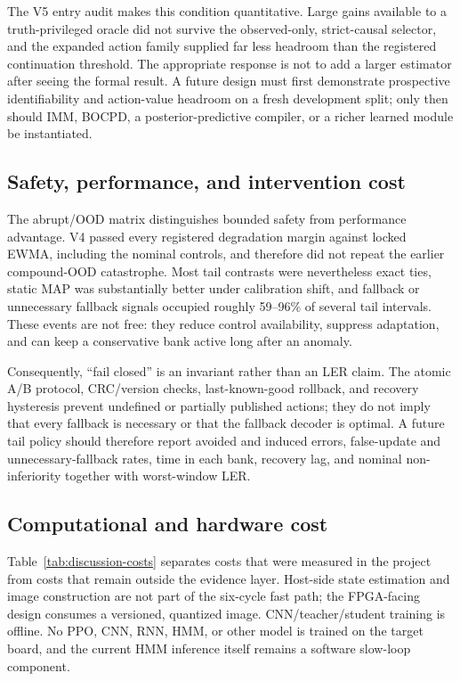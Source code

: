 \documentclass[11pt]{article}
\begin{document}
The V5 entry audit makes this condition quantitative.  Large gains available
to a truth-privileged oracle did not survive the observed-only, strict-causal
selector, and the expanded action family supplied far less headroom than the
registered continuation threshold.  The appropriate response is not to add a
larger estimator after seeing the formal result.  A future design must first
demonstrate prospective identifiability and action-value headroom on a fresh
development split; only then should IMM, BOCPD, a posterior-predictive compiler,
or a richer learned module be instantiated.

\subsection{Safety, performance, and intervention cost}

The abrupt/OOD matrix distinguishes bounded safety from performance advantage.
V4 passed every registered degradation margin against locked EWMA, including
the nominal controls, and therefore did not repeat the earlier compound-OOD
catastrophe.  Most tail contrasts were nevertheless exact ties, static MAP was
substantially better under calibration shift, and fallback or unnecessary
fallback signals occupied roughly 59--96\% of several tail intervals.  These
events are not free: they reduce control availability, suppress adaptation, and
can keep a conservative bank active long after an anomaly.

Consequently, ``fail closed'' is an invariant rather than an LER claim.  The
atomic A/B protocol, CRC/version checks, last-known-good rollback, and recovery
hysteresis prevent undefined or partially published actions; they do not imply
that every fallback is necessary or that the fallback decoder is optimal.  A
future tail policy should therefore report avoided and induced errors,
false-update and unnecessary-fallback rates, time in each bank, recovery lag,
and nominal non-inferiority together with worst-window LER.

\subsection{Computational and hardware cost}

Table~\ref{tab:discussion-costs} separates costs that were measured in the
project from costs that remain outside the evidence layer.  Host-side state
estimation and image construction are not part of the six-cycle fast path; the
FPGA-facing design consumes a versioned, quantized image.  CNN/teacher/student
training is offline.  No PPO, CNN, RNN, HMM, or other model is trained on the
target board, and the current HMM inference itself remains a software slow-loop
component.
\end{document}
